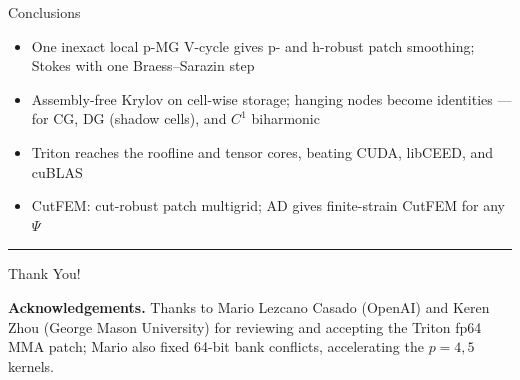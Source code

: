 \documentclass{beamer}
\begin{document}
\begin{frame}{Conclusions}
    \begin{itemize}
        \item One inexact local p-MG V-cycle gives \alert{p- and h-robust} patch smoothing; \alert{Stokes} with one Braess--Sarazin
              step
        \item \alert{Assembly-free Krylov} on cell-wise storage; hanging nodes become identities --- for CG, DG (shadow
              cells), and $C^1$ biharmonic
        \item Triton reaches the roofline and tensor cores, \alert{beating CUDA, libCEED, and cuBLAS}
        \item CutFEM: \alert{cut-robust} patch multigrid; \alert{AD} gives finite-strain CutFEM for any $\Psi$
    \end{itemize}
    \vfill

    \begin{center}
        \color{structure.fg}\rule{\linewidth}{0.5mm}
    \end{center}

    \vspace{0.1cm}

    \begin{center}
        {\huge\textsf{Thank You!}}
    \end{center}
    \vspace{0.15cm}
    {\scriptsize\noindent\textbf{Acknowledgements.} Thanks to Mario Lezcano Casado (OpenAI) and Keren Zhou (George Mason University)
        for reviewing and accepting the Triton fp64 MMA patch; Mario also fixed 64-bit bank conflicts, accelerating the $p=4,5$ kernels.\par}
\end{frame}
\end{document}
